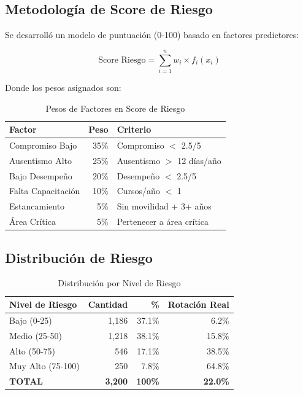 \documentclass[11pt,a4paper,twoside]{article}
\begin{document}
\subsection{Metodología de Score de Riesgo}

Se desarrolló un modelo de puntuación (0-100) basado en factores predictores:

\[
\text{Score Riesgo} = \sum_{i=1}^{n} w_i \times f_i(x_i)
\]

Donde los pesos asignados son:

\begin{table}[H]
    \centering
    \caption{Pesos de Factores en Score de Riesgo}
    \begin{tabular}{|l|r|l|}
        \toprule
        \textbf{Factor} & \textbf{Peso} & \textbf{Criterio} \\
        \midrule
        Compromiso Bajo & 35\% & Compromiso $<$ 2.5/5 \\
        Ausentismo Alto & 25\% & Ausentismo $>$ 12 días/año \\
        Bajo Desempeño & 20\% & Desempeño $<$ 2.5/5 \\
        Falta Capacitación & 10\% & Cursos/año $<$ 1 \\
        Estancamiento & 5\% & Sin movilidad + 3+ años \\
        Área Crítica & 5\% & Pertenecer a área crítica \\
        \bottomrule
    \end{tabular}
\end{table}

\subsection{Distribución de Riesgo}

\begin{table}[H]
    \centering
    \caption{Distribución por Nivel de Riesgo}
    \begin{tabular}{|l|r|r|r|}
        \toprule
        \textbf{Nivel de Riesgo} & \textbf{Cantidad} & \textbf{\%} & \textbf{Rotación Real} \\
        \midrule
        Bajo (0-25) & 1,186 & 37.1\% & 6.2\% \\
        Medio (25-50) & 1,218 & 38.1\% & 15.8\% \\
        Alto (50-75) & 546 & 17.1\% & 38.5\% \\
        Muy Alto (75-100) & 250 & 7.8\% & 64.8\% \\
        \midrule
        \textbf{TOTAL} & \textbf{3,200} & \textbf{100\%} & \textbf{22.0\%} \\
        \bottomrule
    \end{tabular}
\end{table}
\end{document}

